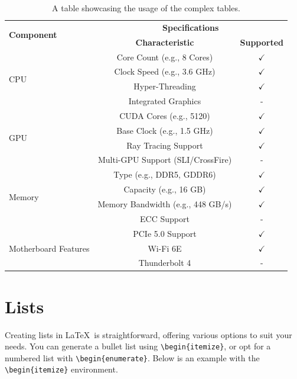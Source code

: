 \begin{table}[!htpb]
    \caption{A table showcasing the usage of the complex tables.}
    \label{tab:table-04}
    \centering
    \begin{tabular}{lcc}
        \toprule
        \multirow{2}{*}{\textbf{Component}} & \multicolumn{2}{c}{\textbf{Specifications}} \\
        \cmidrule(lr){2-3}
        & \textbf{Characteristic} & \textbf{Supported} \\
        \midrule
        \multirow{4}{*}{CPU} & Core Count (e.g., 8 Cores) & $\checkmark$ \\
        & Clock Speed (e.g., 3.6 GHz) & $\checkmark$ \\
        & Hyper-Threading & $\checkmark$ \\
        & Integrated Graphics & - \\
        \midrule
        \multirow{4}{*}{GPU} & CUDA Cores (e.g., 5120) & $\checkmark$ \\
        & Base Clock (e.g., 1.5 GHz) & $\checkmark$ \\
        & Ray Tracing Support & $\checkmark$ \\
        & Multi-GPU Support (SLI/CrossFire) & - \\
        \midrule
        \multirow{4}{*}{Memory} & Type (e.g., DDR5, GDDR6) & $\checkmark$ \\
        & Capacity (e.g., 16 GB) & $\checkmark$ \\
        & Memory Bandwidth (e.g., 448 GB/s) & $\checkmark$ \\
        & ECC Support & - \\
        \midrule
        \multirow{3}{*}{Motherboard Features} & PCIe 5.0 Support & $\checkmark$ \\
        & Wi-Fi 6E & $\checkmark$ \\
        & Thunderbolt 4 & - \\
        \bottomrule
    \end{tabular}
\end{table}

\section{Lists}
Creating lists in \LaTeX\ is straightforward, offering various options to suit your needs. You can generate a bullet list using \verb|\begin{itemize}|, or opt for a numbered list with \verb|\begin{enumerate}|. Below is an example with the \verb|\begin{itemize}| environment.

